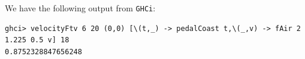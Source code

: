 We have the following output from \verb|GHCi|:

\begin{lstlisting}
ghci> velocityFtv 6 20 (0,0) [\(t,_) -> pedalCoast t,\(_,v) -> fAir 2 1.225 0.5 v] 18
0.8752328847656248
\end{lstlisting}
